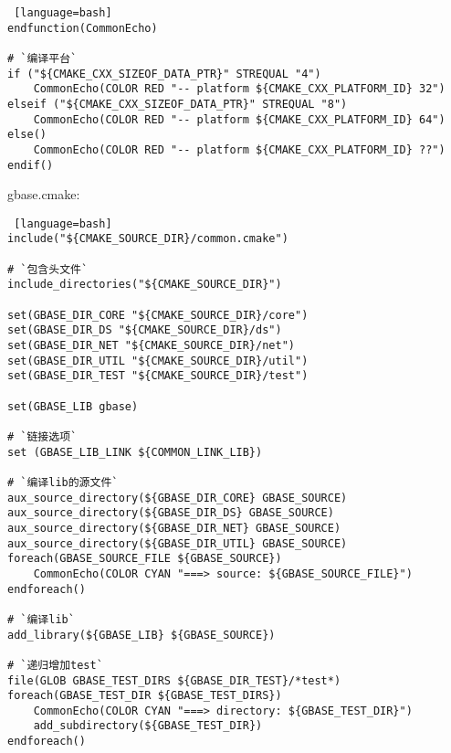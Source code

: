{\begin{lstlisting} [language=bash]
endfunction(CommonEcho)

# `编译平台`
if ("${CMAKE_CXX_SIZEOF_DATA_PTR}" STREQUAL "4")
    CommonEcho(COLOR RED "-- platform ${CMAKE_CXX_PLATFORM_ID} 32")
elseif ("${CMAKE_CXX_SIZEOF_DATA_PTR}" STREQUAL "8")
    CommonEcho(COLOR RED "-- platform ${CMAKE_CXX_PLATFORM_ID} 64")
else()
    CommonEcho(COLOR RED "-- platform ${CMAKE_CXX_PLATFORM_ID} ??")
endif()
\end{lstlisting}

{gbase.cmake: }\par
\begin{lstlisting} [language=bash]
include("${CMAKE_SOURCE_DIR}/common.cmake")

# `包含头文件`
include_directories("${CMAKE_SOURCE_DIR}")

set(GBASE_DIR_CORE "${CMAKE_SOURCE_DIR}/core")
set(GBASE_DIR_DS "${CMAKE_SOURCE_DIR}/ds")
set(GBASE_DIR_NET "${CMAKE_SOURCE_DIR}/net")
set(GBASE_DIR_UTIL "${CMAKE_SOURCE_DIR}/util")
set(GBASE_DIR_TEST "${CMAKE_SOURCE_DIR}/test")

set(GBASE_LIB gbase)

# `链接选项`
set (GBASE_LIB_LINK ${COMMON_LINK_LIB})

# `编译lib的源文件`
aux_source_directory(${GBASE_DIR_CORE} GBASE_SOURCE)
aux_source_directory(${GBASE_DIR_DS} GBASE_SOURCE)
aux_source_directory(${GBASE_DIR_NET} GBASE_SOURCE)
aux_source_directory(${GBASE_DIR_UTIL} GBASE_SOURCE)
foreach(GBASE_SOURCE_FILE ${GBASE_SOURCE})
    CommonEcho(COLOR CYAN "===> source: ${GBASE_SOURCE_FILE}")
endforeach()

# `编译lib`
add_library(${GBASE_LIB} ${GBASE_SOURCE})

# `递归增加test`
file(GLOB GBASE_TEST_DIRS ${GBASE_DIR_TEST}/*test*)
foreach(GBASE_TEST_DIR ${GBASE_TEST_DIRS})
    CommonEcho(COLOR CYAN "===> directory: ${GBASE_TEST_DIR}")
    add_subdirectory(${GBASE_TEST_DIR})
endforeach()
\end{lstlisting}
}


